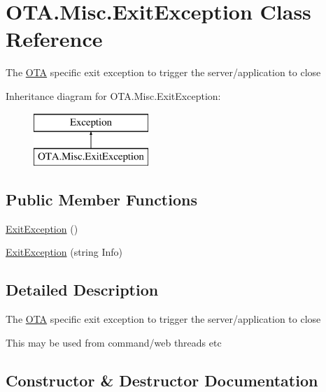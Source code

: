 \hypertarget{class_o_t_a_1_1_misc_1_1_exit_exception}{}\section{O\+T\+A.\+Misc.\+Exit\+Exception Class Reference}
\label{class_o_t_a_1_1_misc_1_1_exit_exception}


The \hyperlink{namespace_o_t_a}{O\+T\+A} specific exit exception to trigger the server/application to close  


Inheritance diagram for O\+T\+A.\+Misc.\+Exit\+Exception\+:\begin{figure}[H]
\begin{center}
\leavevmode
\includegraphics[height=2.000000cm]{class_o_t_a_1_1_misc_1_1_exit_exception}
\end{center}
\end{figure}
\subsection*{Public Member Functions}
\begin{DoxyCompactItemize}
\item 
\hyperlink{class_o_t_a_1_1_misc_1_1_exit_exception_a1a5fe68ffa3a5e1f47d5562935e0fe38}{Exit\+Exception} ()
\item 
\hyperlink{class_o_t_a_1_1_misc_1_1_exit_exception_a6290493bb29b643cca7b679ed53aedc1}{Exit\+Exception} (string Info)
\end{DoxyCompactItemize}


\subsection{Detailed Description}
The \hyperlink{namespace_o_t_a}{O\+T\+A} specific exit exception to trigger the server/application to close 

This may be used from command/web threads etc

\subsection{Constructor \& Destructor Documentation}
\hypertarget{class_o_t_a_1_1_misc_1_1_exit_exception_a1a5fe68ffa3a5e1f47d5562935e0fe38}{}
